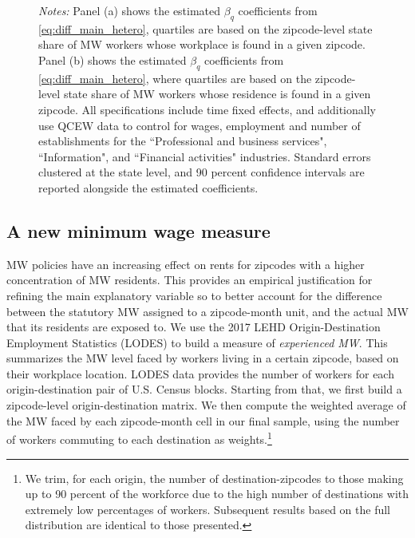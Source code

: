 \begin{figure}[htb!]
\begin{subfigure}[b]{\textwidth}
	\end{subfigure}
	\begin{minipage}{\textwidth}\footnotesize
		\vspace{3mm}	
		\textit{Notes:} Panel (a) shows the estimated $\beta_q$ coefficients from \autoref{eq:diff_main_hetero},  quartiles are 
		based on the zipcode-level state share of MW workers whose workplace is found in a given zipcode. 
		Panel (b) shows the estimated $\beta_q$ coefficients from \autoref{eq:diff_main_hetero}, where quartiles are 
		based on the zipcode-level state share of MW workers whose residence is found in a given zipcode. 
		All specifications include time fixed effects, 
		and additionally use QCEW data to control for wages, employment and number of establishments 
		for the ``Professional and business services", ``Information", and ``Financial activities" industries.
		Standard errors clustered at the state level, and 90 percent confidence intervals are reported alongside 
		the estimated coefficients. 
	\end{minipage}
\end{figure}



\subsection{A new minimum wage measure}
MW policies have an increasing effect on rents for zipcodes with a higher concentration of MW residents. 
This provides an empirical justification for refining the main explanatory variable so to better account for 
the difference between the statutory MW assigned to a zipcode-month unit, and the actual MW that its 
residents are exposed to. We use the 2017 LEHD Origin-Destination Employment Statistics (LODES) to 
build a measure of \textit{experienced MW}. This summarizes the MW level faced by workers living in a certain zipcode, 
based on their workplace location. LODES data provides the number of workers for each origin-destination 
pair of U.S. Census blocks. Starting from that, we first build a zipcode-level origin-destination matrix. 
We then compute the weighted average of the MW faced by each zipcode-month cell in our final sample, 
using the number of workers commuting to each destination as weights.\footnote{We trim, for each 
	origin, the number of destination-zipcodes to those making up to 90 percent of the workforce due to 
	the high number of destinations with extremely low percentages of workers. Subsequent results 
	based on the full distribution are identical to those presented.} 

